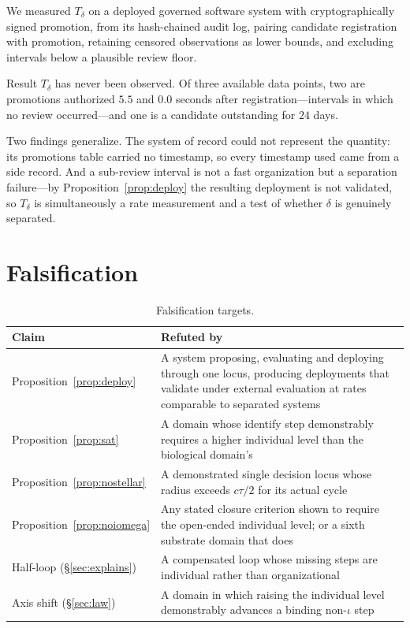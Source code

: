\documentclass[11pt]{article}
\newcommand{\Td}{\ensuremath{T_\delta}}
\begin{document}
We measured \Td{} on a deployed governed software system with cryptographically signed promotion, from its hash-chained audit log, pairing candidate registration with promotion, retaining censored observations as lower bounds, and excluding intervals below a plausible review floor.

\begin{cautionbox}{Result}
\Td{} has never been observed. Of three available data points, two are promotions authorized $5.5$ and $0.0$ seconds after registration---intervals in which no review occurred---and one is a candidate outstanding for $24$ days.
\end{cautionbox}

Two findings generalize. The system of record could not represent the quantity: its promotions table carried no timestamp, so every timestamp used came from a side record. And a sub-review interval is not a fast organization but a separation failure---by Proposition~\ref{prop:deploy} the resulting deployment is not validated, so \Td{} is simultaneously a rate measurement and a test of whether $\delta$ is genuinely separated.

\section{Falsification}

\begin{table}[h]
\centering\small
\begin{tabularx}{\textwidth}{@{}lY@{}}
\toprule
Claim & Refuted by \\
\midrule
Proposition~\ref{prop:deploy} & A system proposing, evaluating and deploying through one locus, producing deployments that validate under external evaluation at rates comparable to separated systems \\
Proposition~\ref{prop:sat} & A domain whose identify step demonstrably requires a higher individual level than the biological domain's \\
Proposition~\ref{prop:nostellar} & A demonstrated single decision locus whose radius exceeds $c\tau/2$ for its actual cycle \\
Proposition~\ref{prop:noiomega} & Any stated closure criterion shown to require the open-ended individual level; or a sixth substrate domain that does \\
Half-loop (\S\ref{sec:explains}) & A compensated loop whose missing steps are individual rather than organizational \\
Axis shift (\S\ref{sec:law}) & A domain in which raising the individual level demonstrably advances a binding non-$\iota$ step \\
\bottomrule
\end{tabularx}
\caption{Falsification targets.}
\end{table}
\end{document}
